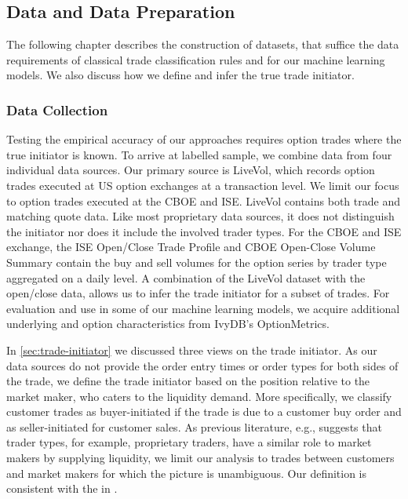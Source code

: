 \subsection{Data and Data Preparation}\label{sec:data-and-data-preparation}

The following chapter describes the construction of datasets, that suffice the data requirements of classical trade classification rules and for our machine learning models. We also discuss how we define and infer the true trade initiator.

\subsubsection{Data Collection}\label{sec:data-collection}


Testing the empirical accuracy of our approaches requires option trades where the true initiator is known. To arrive at labelled sample, we combine data from four individual data sources. Our primary source is LiveVol, which records option trades executed at US option exchanges at a transaction level. We limit our focus to option trades executed at the \gls{CBOE} and \gls{ISE}. LiveVol contains both trade and matching quote data. Like most proprietary data sources, it does not distinguish the initiator nor does it include the involved trader types. For the \gls{CBOE} and \gls{ISE} exchange, the \gls{ISE} Open/Close Trade Profile and \gls{CBOE} Open-Close Volume Summary contain the buy and sell volumes for the option series by trader type aggregated on a daily level. A combination of the LiveVol dataset with the open/close data, allows us to infer the trade initiator for a subset of trades. For evaluation and use in some of our machine learning models, we acquire additional underlying and option characteristics from IvyDB's OptionMetrics.


In \cref{sec:trade-initiator} we discussed three views on the trade initiator. As our data sources do not provide the order entry times or order types for both sides of the trade, we define the trade initiator based on the position relative to the market maker, who caters to the liquidity demand. More specifically, we classify customer trades as buyer-initiated if the trade is due to a customer buy order and as seller-initiated for customer sales. As previous literature, e.g., \textcite[][4276]{garleanuDemandBasedOptionPricing2009} suggests that trader types, for example, proprietary traders, have a similar role to market makers by supplying liquidity, we limit our analysis to trades between customers and market makers for which the picture is unambiguous. Our definition is consistent with the in \textcite[][8]{grauerOptionTradeClassification2022}.

